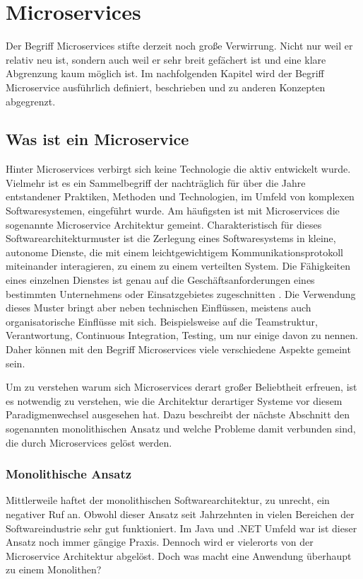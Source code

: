 \chapter{Microservices}

Der Begriff Microservices stifte derzeit noch große Verwirrung. Nicht nur weil er relativ neu ist, sondern auch weil er sehr breit gefächert ist und eine klare Abgrenzung kaum möglich ist. Im nachfolgenden Kapitel wird der Begriff Microservice ausführlich definiert, beschrieben und zu anderen Konzepten abgegrenzt.

\section{Was ist ein Microservice}

Hinter Microservices verbirgt sich keine Technologie die aktiv entwickelt wurde. Vielmehr ist es ein Sammelbegriff der nachträglich für über die Jahre entstandener Praktiken, Methoden und Technologien, im Umfeld von komplexen Softwaresystemen, eingeführt wurde. Am häufigsten ist mit Microservices die sogenannte Microservice Architektur gemeint. Charakteristisch für dieses Softwarearchitekturmuster ist die Zerlegung eines Softwaresystems in kleine, autonome Dienste, die mit einem leichtgewichtigem Kommunikationsprotokoll miteinander interagieren, zu einem zu einem verteilten System. Die Fähigkeiten eines einzelnen Dienstes ist genau auf die Geschäftsanforderungen eines bestimmten Unternehmens oder Einsatzgebietes zugeschnitten \cite{FowlerMS}. Die Verwendung dieses Muster bringt aber neben technischen Einflüssen, meistens auch organisatorische Einflüsse mit sich. Beispielsweise auf die Teamstruktur, Verantwortung, Continuous Integration, Testing, um nur einige davon zu nennen. Daher können mit den Begriff Microservices viele verschiedene Aspekte gemeint sein.

Um zu verstehen warum sich Microservices derart großer Beliebtheit erfreuen, ist es notwendig zu verstehen, wie die Architektur derartiger Systeme vor diesem Paradigmenwechsel ausgesehen hat. Dazu beschreibt der nächste Abschnitt den sogenannten monolithischen Ansatz und welche Probleme damit verbunden sind, die durch Microservices gelöst werden.

\subsection{Monolithische Ansatz}

Mittlerweile haftet der monolithischen Softwarearchitektur, zu unrecht, ein negativer Ruf an. Obwohl dieser Ansatz seit Jahrzehnten  in vielen Bereichen der Softwareindustrie sehr gut funktioniert. Im Java und .NET Umfeld war \bzw ist dieser Ansatz noch immer gängige Praxis. Dennoch wird er vielerorts von der Microservice Architektur abgelöst. Doch was macht eine Anwendung überhaupt zu einem Monolithen?

